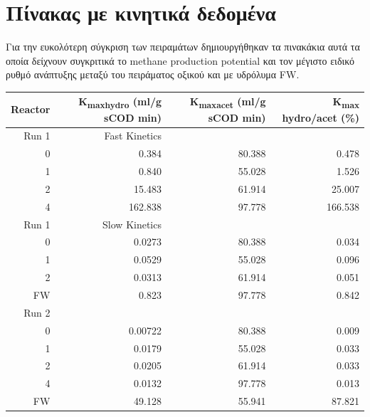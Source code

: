 \documentclass[11pt]{article}
\begin{document}
\section{Πίνακας με κινητικά δεδομένα}
\label{sec:orgbc641cc}
Για την ευκολότερη σύγκριση των πειραμάτων δημιουργήθηκαν τα πινακάκια αυτά τα οποία δείχνουν συγκριτικά το methane production potential και τον μέγιστο ειδικό ρυθμό ανάπτυξης μεταξύ του πειράματος οξικού και με υδρόλυμα FW. 

\begin{center}
\begin{tabular}{rrrr}
Reactor & K\textsubscript{max}\textsubscript{hydro} (ml/g sCOD min) & K\textsubscript{max}\textsubscript{acet} (ml/g sCOD min) & K\textsubscript{max} hydro/acet (\%)\\[0pt]
\hline
Run 1 & Fast Kinetics &  & \\[0pt]
\hline
0 & 0.384 & 80.388 & 0.478\\[0pt]
1 & 0.840 & 55.028 & 1.526\\[0pt]
2 & 15.483 & 61.914 & 25.007\\[0pt]
4 & 162.838 & 97.778 & 166.538\\[0pt]
\hline
Run 1 & Slow Kinetics &  & \\[0pt]
\hline
0 & 0.0273 & 80.388 & 0.034\\[0pt]
1 & 0.0529 & 55.028 & 0.096\\[0pt]
2 & 0.0313 & 61.914 & 0.051\\[0pt]
FW & 0.823 & 97.778 & 0.842\\[0pt]
\hline
Run 2 &  &  & \\[0pt]
\hline
0 & 0.00722 & 80.388 & 0.009\\[0pt]
1 & 0.0179 & 55.028 & 0.033\\[0pt]
2 & 0.0205 & 61.914 & 0.033\\[0pt]
4 & 0.0132 & 97.778 & 0.013\\[0pt]
FW & 49.128 & 55.941 & 87.821\\[0pt]
\hline
\end{tabular}
\end{center}
\end{document}

